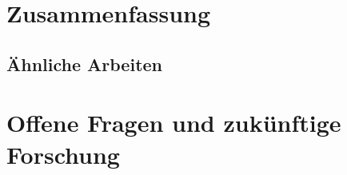 \section{Zusammenfassung}
\begin{comment}
\begin{table}[htb]
\centering
 \renewcommand{\arraystretch}{1.5} 
\begin{tabular}{|l|c|c|c|c|c|}
\hline
$\:$Protocol & \multicolumn{1}{c|}{WSP} & GTSP & SP & SPP &SSP  \\
\hline
$\:$Cut $\&$ Choose & \Checkmark & \Checkmark  &\Checkmark & \Checkmark &  \XSolidBrush\\
\hline
$\:$Last-Diminisher & \Checkmark & (\Checkmark) & \Checkmark& \Checkmark &  \XSolidBrush\\
\hline
$\:$Lone-Chooser & \Checkmark & \Checkmark  &\Checkmark & \Checkmark &  \XSolidBrush\\
\hline
$\:$Lone-Divider & \Checkmark & \XSolidBrush  & \XSolidBrush &\XSolidBrush & \XSolidBrush \\
\hline
$\:$Divide-$\&$-Conquer & \Checkmark & \Checkmark &\Checkmark &\Checkmark &  \XSolidBrush \\
\hline
\end{tabular}
\caption{Overview: Strategyproofness of proportional cake-cutting protocols}\label{ov}
\end{table}
\end{comment}
\subsection{Ähnliche Arbeiten}
\begin{comment}
\end{comment}
\section{Offene Fragen und zukünftige Forschung}
\pagebreak

